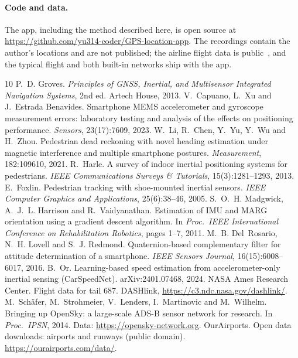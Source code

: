 \documentclass[11pt]{article}
\begin{document}
\paragraph{Code and data.} The app, including the method described here, is open source at
\url{https://github.com/yu314-coder/GPS-location-app}. The recordings contain the author's locations and
are not published; the airline flight data is public~\cite{dashlink,opensky}, and the typical flight and
both built-in networks ship with the app.

\begin{thebibliography}{10}
\small\setlength{\itemsep}{1pt}
 P.~D. Groves. \emph{Principles of GNSS, Inertial, and Multisensor Integrated Navigation
Systems}, 2nd ed. Artech House, 2013.
 V.~Capuano, L.~Xu and J.~Estrada Benavides. Smartphone MEMS accelerometer and
gyroscope measurement errors: laboratory testing and analysis of the effects on positioning
performance. \emph{Sensors}, 23(17):7609, 2023.
 W.~Li, R.~Chen, Y.~Yu, Y.~Wu and H.~Zhou. Pedestrian dead reckoning with novel
heading estimation under magnetic interference and multiple smartphone postures.
\emph{Measurement}, 182:109610, 2021.
 R.~Harle. A survey of indoor inertial positioning systems for pedestrians. \emph{IEEE
Communications Surveys \& Tutorials}, 15(3):1281--1293, 2013.
 E.~Foxlin. Pedestrian tracking with shoe-mounted inertial sensors. \emph{IEEE Computer
Graphics and Applications}, 25(6):38--46, 2005.
 S.~O.~H. Madgwick, A.~J.~L. Harrison and R.~Vaidyanathan. Estimation of IMU and MARG
orientation using a gradient descent algorithm. In \emph{Proc.\ IEEE International Conference on
Rehabilitation Robotics}, pages 1--7, 2011.
 M.~B. Del~Rosario, N.~H. Lovell and S.~J. Redmond. Quaternion-based complementary
filter for attitude determination of a smartphone. \emph{IEEE Sensors Journal}, 16(15):6008--6017,
2016.
 B.~Or. Learning-based speed estimation from accelerometer-only inertial sensing
(CarSpeedNet). arXiv:2401.07468, 2024.
 NASA Ames Research Center. Flight data for tail 687. DASHlink,
\url{https://c3.ndc.nasa.gov/dashlink/}.
 M.~Sch\"afer, M.~Strohmeier, V.~Lenders, I.~Martinovic and M.~Wilhelm. Bringing up OpenSky:
a large-scale ADS-B sensor network for research. In \emph{Proc.\ IPSN}, 2014. Data:
\url{https://opensky-network.org}.
 OurAirports. Open data downloads: airports and runways (public domain).
\url{https://ourairports.com/data/}.
\end{thebibliography}
\end{document}
